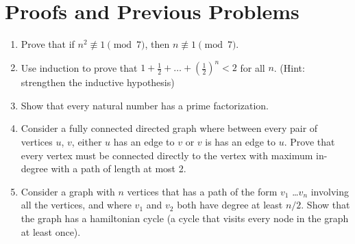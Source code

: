 \documentclass{article}
\begin{document}
\section{Proofs and Previous Problems}
\begin{enumerate}
    \item Prove that if $ n^2 \not\equiv 1 \pmod 7$, then $n \not\equiv 1 \pmod 7$.
    \ \\
    \begin{solution}
    \end{solution}
    \item Use induction to prove that $1 + \frac{1}{2} + \ldots + \left(\frac{1}{2}\right)^n < 2$ for all $n$. (Hint: strengthen the inductive hypothesis)
    \ \\
    \begin{solution}
    \end{solution}
    \item Show that every natural number has a prime factorization.
    \ \\
    \begin{solution}
    \end{solution}
    \item Consider a fully connected directed graph where between every pair of vertices $u$, $v$, either $u$ has an edge to $v$ or $v$ is has an edge to $u$. Prove that every vertex must be connected directly to the vertex with maximum in-degree with a path of length at most 2.
    \ \\ 
    \begin{solution}
    \end{solution}
    \item Consider a graph with $n$ vertices that has a path of the form $v_1$ \ldots $v_n$ involving all the vertices, and where $v_1$ and $v_2$ both have degree at least $n/2$. Show that the graph has a hamiltonian cycle (a cycle that visits every node in the graph at least once).
    \ \\ 
    \begin{solution}
    \end{solution}
\end{enumerate}
\end{document}
